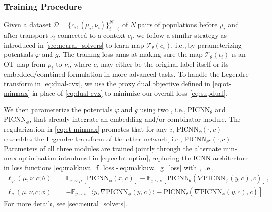 \subsubsection{Training Procedure}

 Given a dataset $\mathcal{D}=\{c_i, (\mu_i, \nu_i) \}_{i=0}^N$ of $N$ pairs of populations before $\mu_i$ and after transport $\nu_i$ connected to a context $c_i$, we follow a similar strategy as introduced in \cref{sec:neural_solvers} to learn map $\mathcal{T}_\theta(c_i)$, i.e., by parameterizing potentials $\varphi$ and $g$. 
The training loss aims at making sure the map $\mathcal{T}_\theta(c_i)$ is an \acrshort{OT} map from $\mu_i$ to $\nu_i$, where $c_i$ may either be the original label itself or its embedded/combined formulation in more advanced tasks. To handle the Legendre transform in \eqref{eq:dual-cvx}, we use the proxy dual objective defined in \eqref{eq:ot-minmax} \citep{makkuva2020optimal} in place of \eqref{eq:dual-cvx} to minimize our overall loss~\eqref{eq:supdual}.

We then parameterize the potentials $\varphi$ and $g$ using two , i.e., $\text{PICNN}_{\theta}$ and $\text{PICNN}_{\phi}$, that already integrate an embedding and/or combinator module. The regularization in \eqref{eq:ot-minmax} promotes that for any $c$, $\text{PICNN}_{\phi}(\cdot,c)$ resembles the Legendre transform of the other network, i.e., $\text{PICNN}_{\theta^\star}(\cdot,c)$.
Parameters of all three modules are trained jointly through the alternate min-max optimization introduced in \eqref{eq:cellot-optim}, replacing the \acrshort{ICNN} architecture in loss functions \eqref{eq:makkuva_f_loss}-\eqref{eq:makkuva_g_loss} with , i.e.,
\begin{align*} 
    \ell_\varphi(\mu, \nu, c; \theta) &= \mathbb{E}_{x \sim \mu}[\text{PICNN}_{\phi}(x, c)] - \mathbb{E}_{y \sim \nu}[\text{PICNN}_{\theta}(\nabla \text{PICNN}_{\phi}(y, c), c)], \\
    \ell_g(\mu, \nu, c; \phi) &= -\mathbb{E}_{y \sim \nu}[\langle y, \nabla \text{PICNN}_{\phi}(y, c)\rangle-\text{PICNN}_{\theta}(\nabla \text{PICNN}_{\phi}(y, c), c)].
\end{align*}
For more details, see \cref{sec:neural_solvers}.


